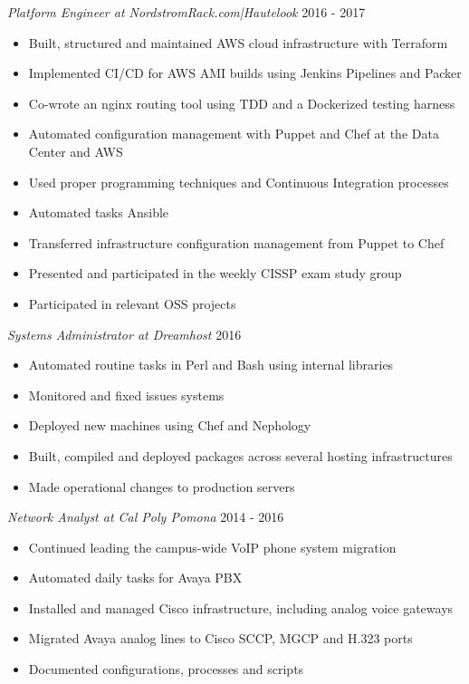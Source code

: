 \documentclass[line]{tex/res}
\begin{document}
\begin{resume}
    {\sl Platform Engineer at NordstromRack.com|Hautelook} \hfill 2016 - 2017
    \begin{itemize} \itemsep -2pt %
        \item Built, structured and maintained AWS cloud infrastructure with Terraform
        \item Implemented CI/CD for AWS AMI builds using Jenkins Pipelines and Packer
        \item Co-wrote an nginx routing tool using TDD and a Dockerized testing harness
        \item Automated configuration management with Puppet and Chef at the Data Center and AWS
        \item Used proper programming techniques and Continuous Integration processes
        \item Automated tasks Ansible
        \item Transferred infrastructure configuration management from Puppet to Chef
        \item Presented and participated in the weekly CISSP exam study group
        \item Participated in relevant OSS projects
    \end{itemize}

	{\sl Systems Administrator at Dreamhost} \hfill 2016
	\begin{itemize} \itemsep -2pt
		\item Automated routine tasks in Perl and Bash using internal libraries
		\item Monitored and fixed issues systems
		\item Deployed new machines using Chef and Nephology
		\item Built, compiled and deployed packages across several hosting infrastructures
		\item Made operational changes to production servers
	\end{itemize}

	{\sl Network Analyst at Cal Poly Pomona} \hfill 2014 - 2016
	\begin{itemize} \itemsep -2pt
		\item Continued leading the campus-wide VoIP phone system migration
		\item Automated daily tasks for Avaya PBX
		\item Installed and managed Cisco infrastructure, including analog voice gateways
		\item Migrated Avaya analog lines to Cisco SCCP, MGCP and H.323 ports
		\item Documented configurations, processes and scripts
	\end{itemize}


\end{resume}
\end{document}

